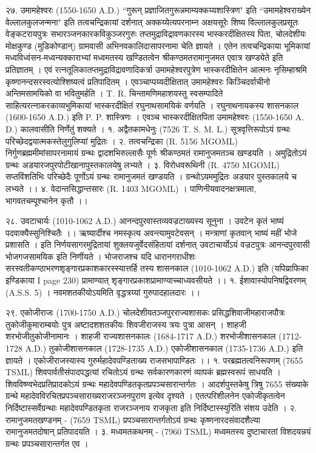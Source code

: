 २७. उमामहेश्वरः (1550-1650 A.D.)
``गुरून् प्रज्ञाजितगुरून्नमाम्यक्कय्यशास्त्रिण" इति ``उमामहेश्वराख्येन वेल्लालकुलजन्मना" इति तत्वचन्द्रिकायां दर्शनात् अक्कय्येत्यपरनाम्न अक्षयसूरेः शिष्य विल्लालकुलप्रसूतः वेङ्कटरायपुत्रः सभारञ्जनकारकविकुञ्जरगुरुः तप्तमुद्राविद्रावणकारस्य भास्करदीक्षितस्य पिता, चोलदेशीयः मोक्षकुण्ड (मुडिकोण्डान्) ग्रामवासी अभिनवकालिदासापरनामा चेति ज्ञायते । एतेन तत्वचन्द्रिकाया भूमिकायां मध्वविध्वंसन-मध्वन्यक्काराभ्यां मध्वमतस्य खण्डितत्वेन श्रीकण्ठमतरामानुजमत एवात्र खण्ड्येते इति प्रतिज्ञातम् । एवं रत्नतूलिकातप्तमुद्राविद्रावणादिकर्त्रा उमामहेश्वरपुत्रेण भास्करदीक्षितेन आत्मनः नृसिम्हाश्रमि कृष्णानन्दसरस्वत्योश्शिष्यत्वं प्रतिपादितम् । एवञ्चाप्पय्यदीक्षितात् उमामहेश्वरः किञ्चिदर्वाचीनो अन्तिमसामयिको वा भवितुमर्हति । T. R. चिन्तामणिमहाशयस्तु स्वसम्पादिते साहित्यरत्नाकरकाव्यभुमिकायां भास्करदीक्षितं रघुनाथसामयिकं वर्णयति । रघुनाथनायकस्य शासनकाल (1600-1650 A.D.) इति P. P. शास्त्रिणः । एवञ्च भास्करदीक्षितपिता उमामहेश्वरः (1550-1650 A. D.) कालवासीति निर्णेतुं शक्यते ।
१. अद्वैतकामधेनुः (7526 T. S. M. L.) सूत्रवृत्तिरूपोऽयं ग्रन्थः परिच्छेदद्वयात्मकस्तेलुगुलिप्यां मुद्रितः ।
२. तत्वचन्द्रिका (R. 5156 MGOML)
निर्गुणब्रह्ममीमांसापरनामायं ग्रन्थः द्वादशभिरुल्लासैः पूर्णः श्रीकण्ठमतं रामानुजमतञ्च खण्डयति । अमुद्रितोऽयं ग्रन्थः अडयारजपुरपोटीखानापुस्तकालयेषु लभ्यते ।
३. विरोधवरूथिनी (R. 4750 MGOML)
सप्तविंशतिभिः परिच्छेदैः पूर्णोऽयं ग्रन्थः रामानुजमतं खण्डयति । ग्रन्थोऽयममुद्रितः अडयार पुस्तकालये च लभ्यते ।।
४. वेदान्तसिद्धान्तसारः (R. 1403 MGOML) । पाणिनीयवादनक्षत्रमाला, भागवतचम्पूश्चानेन कृतौ ।।

२८. उवटाचार्यः (1010-1062 A.D.)
आनन्दपुरवास्तव्यवज्रटाख्यस्य सूनुना ।
उवटेन कृतं भाष्यं पदवाक्यैस्सुनिश्चितैः ।।
ऋष्यार्दीश्च नमस्कृत्य अवन्त्यामुवटेवसन् ।
मन्त्राणां कृतवान् भाष्यं महीं भोजे प्रशासति ।
इति निर्णयसागरमुद्रितायां शुक्लयजुर्वेदसंहितायां दर्शनात् उवटाचार्योऽयं वज्रटपुत्रः आनन्दपुरवासी भोजगजसामयिक इति निर्णीयते । भोजराजश्च यदि धारानगराधीशः सरस्वतीकण्ठाभरणशृङ्गारप्रकाशकारस्स्यात्तर्हि तस्य शासनकाल (1010-1062 A.D.) इति (यपिय्राफिका इण्डिकाया I page 230) प्रामाण्यात् शृङ्गारप्रकाशप्रामाण्याच्चाध्यवसीयते ।।
१. ईशावास्योपनिषद्विवरणम् (A.S.S. 5) । नवमशतकीयोऽयमिति वृद्धत्रय्यां गुरुपादहालदारः ।।

२९.
एकोजीराजः (1700-1750 A.D.)
चोलदेशीयतञ्जपुरराज्यशासकः प्रसिद्धशिवाजीमहाराजपौत्रः तुकोजीकुमाराम्बयोः पुत्र अष्टादशशतकीयः शिवजीराजस्य त्रयः पुत्रा आसन् । शाहजी शरभोजीतुकोजीनामानः । शाहजी राज्यशासनकालः (1684-1717 A.D.) शरभोजीशासनकाल (1712-1728 A.D.) तुकोजीशासनकाल (1728-1735 A.D.) एकोजीशासनकाल (1735-1736 A.D.) इति ज्ञायते । एकोजीराजस्यास्य गुरुर्महादेवपण्डिताख्य राजसभापाण्डितः ।।
१. परब्रह्मतत्वनिरूपणम् (7655 TSML)
शिवपार्वतीसंपादपद्धत्यां रचितोऽयं ग्रन्थः सर्वकारणकारणं व्यापकं ब्रह्मस्वरूपं साधयति । शिवविष्ण्वभेदप्रतिप्रादकोऽयं ग्रन्थः महादेवपण्डितकृतप्रपञ्चसारान्तर्गतः । आदर्शपुस्तकेषु त्रिषु 7655 संख्याके ग्रन्थे महादेवविरचितप्रपञ्चसाराख्यराजरञ्जनपुराण इत्येव दृश्यते । एतत्परिशीलनेन एकोजीकृतत्वेन निर्दिष्टास्सर्वेग्रन्थाः महादेवपण्डितकृता राजरञ्जनाय राजकृता इति निर्दिष्टास्स्युरिति संशय उदेति ।
२. रामानुजमतखण्डनम् - (7659 TSML) प्रपञ्चसारान्तर्गतोऽयं ग्रन्थः कृष्णनारदसंवादशैल्या रामानुजमतदोषान् प्रतिपादयति ।
३. मध्वमतकथनम् - (7960 TSML) मध्वमतस्य दुष्टाचारतां विशदयन्नयं ग्रन्थः प्रपञ्चसारान्तर्गत एव ।

